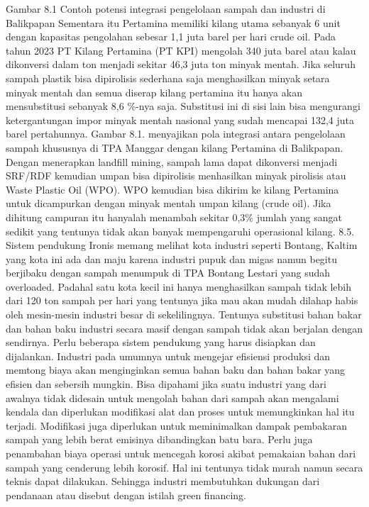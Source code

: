 \documentclass[
  letterpaper,
  DIV=11,
  numbers=noendperiod]{scrreprt}
\begin{document}
Gambar 8.1 Contoh potensi integrasi pengelolaan sampah dan industri di
Balikpapan Sementara itu Pertamina memiliki kilang utama sebanyak 6 unit
dengan kapasitas pengolahan sebesar 1,1 juta barel per hari crude oil.
Pada tahun 2023 PT Kilang Pertamina (PT KPI) mengolah 340 juta barel
atau kalau dikonversi dalam ton menjadi sekitar 46,3 juta ton minyak
mentah. Jika seluruh sampah plastik bisa dipirolisis sederhana saja
menghasilkan minyak setara minyak mentah dan semua diserap kilang
pertamina itu hanya akan mensubstitusi sebanyak 8,6 \%-nya saja.
Substitusi ini di sisi lain bisa mengurangi ketergantungan impor minyak
mentah nasional yang sudah mencapai 132,4 juta barel pertahunnya. Gambar
8.1. menyajikan pola integrasi antara pengelolaan sampah khususnya di
TPA Manggar dengan kilang Pertamina di Balikpapan. Dengan menerapkan
landfill mining, sampah lama dapat dikonversi menjadi SRF/RDF kemudian
umpan bisa dipirolisis menhasilkan minyak pirolisis atau Waste Plastic
Oil (WPO). WPO kemudian bisa dikirim ke kilang Pertamina untuk
dicampurkan dengan minyak mentah umpan kilang (crude oil). Jika dihitung
campuran itu hanyalah menambah sekitar 0,3\% jumlah yang sangat sedikit
yang tentunya tidak akan banyak mempengaruhi operasional kilang. 8.5.
Sistem pendukung Ironis memang melihat kota industri seperti Bontang,
Kaltim yang kota ini ada dan maju karena industri pupuk dan migas namun
begitu berjibaku dengan sampah menumpuk di TPA Bontang Lestari yang
sudah overloaded. Padahal satu kota kecil ini hanya menghasilkan sampah
tidak lebih dari 120 ton sampah per hari yang tentunya jika mau akan
mudah dilahap habis oleh mesin-mesin industri besar di sekelilingnya.
Tentunya substitusi bahan bakar dan bahan baku industri secara masif
dengan sampah tidak akan berjalan dengan sendirnya. Perlu beberapa
sistem pendukung yang harus disiapkan dan dijalankan. Industri pada
umumnya untuk mengejar efisiensi produksi dan memtong biaya akan
menginginkan semua bahan baku dan bahan bakar yang efisien dan sebersih
mungkin. Bisa dipahami jika suatu industri yang dari awalnya tidak
didesain untuk mengolah bahan dari sampah akan mengalami kendala dan
diperlukan modifikasi alat dan proses untuk memungkinkan hal itu
terjadi. Modifikasi juga diperlukan untuk meminimalkan dampak pembakaran
sampah yang lebih berat emisinya dibandingkan batu bara. Perlu juga
penambahan biaya operasi untuk mencegah korosi akibat pemakaian bahan
dari sampah yang cenderung lebih korosif. Hal ini tentunya tidak murah
namun secara teknis dapat dilakukan. Sehingga industri membutuhkan
dukungan dari pendanaan atau disebut dengan istilah green financing.
\end{document}
